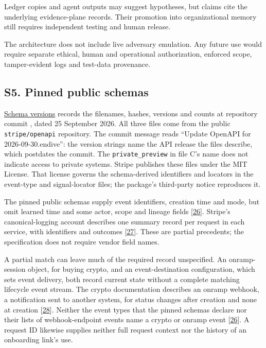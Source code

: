 \documentclass[
  11pt,
]{article}
\begin{document}
Ledger copies and agent outputs may suggest hypotheses, but claims cite
the underlying evidence-plane records. Their promotion into
organizational memory still requires independent testing and human
release.

The architecture does not include live adversary emulation. Any future
use would require separate ethical, human and operational authorization,
enforced scope, tamper-evident logs and test-data provenance.

\FloatBarrier

\hypertarget{s5.-pinned-public-schemas}{%
\subsection{S5. Pinned public schemas}\label{s5.-pinned-public-schemas}}

\suppressfloats[t]

\href{SUPPLEMENT/S5_SCHEMA_VERSIONS.csv}{Schema versions} records the
filenames, hashes, versions and counts at repository commit
\texttt{}, dated 25
September 2026. All three files come from the public
\texttt{stripe/openapi} repository. The commit message reads ``Update
OpenAPI for 2026-09-30.endive'': the version strings name the API
release the files describe, which postdates the commit. The
\texttt{private\_preview} in file C's name does not indicate access to
private systems. Stripe publishes these files under the MIT License.
That license governs the schema-derived identifiers and locators in the
event-type and signal-locator files; the package's third-party notice
reproduces it.

The pinned public schemas supply event identifiers, creation time and
mode, but omit learned time and some actor, scope and lineage fields
{[}\protect\hyperlink{ref-StripeOpenAPI2026}{26}{]}. Stripe's
canonical-logging account describes one summary record per request in
each service, with identifiers and outcomes
{[}\protect\hyperlink{ref-Leach2019}{27}{]}. These are partial
precedents; the specification does not require vendor field names.

A partial match can leave much of the required record unspecified. An
onramp-session object, for buying crypto, and an event-destination
configuration, which sets event delivery, both record current state
without a complete matching lifecycle event stream. The crypto
documentation describes an onramp webhook, a notification sent to
another system, for status changes after creation and none at creation
{[}\protect\hyperlink{ref-Stripe2026CryptoOnramp}{28}{]}. Neither the
event types that the pinned schemas declare nor their lists of
webhook-endpoint events name a crypto or onramp event
{[}\protect\hyperlink{ref-StripeOpenAPI2026}{26}{]}. A request ID
likewise supplies neither full request context nor the history of an
onboarding link's use.
\end{document}
